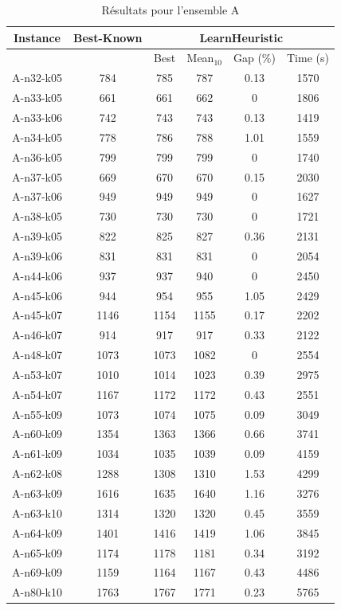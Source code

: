 \documentclass[a4paper,11pt]{article}%
\begin{document}
\begin{table}[h!]
\caption{Résultats pour l'ensemble A}
\label{TA}
\begin{center}
\begin{tabular}{|@{}c@{}|@{}c@{}|@{}c@{}|@{}c@{}|@{}c@{}|@{}c@{}|}

\hline
 Instance & Best-Known & \multicolumn{4}{c|}{LearnHeuristic}  \\
 \hline
 & & Best & Mean$_{10}$ & Gap (\%) & Time (s) \\ 
 \hline
 A-n32-k05 & 784 & 785 & 787 & 0.13 & 1570  \\
 \hline
 A-n33-k05   & 661 & 661 & 662 &0 & 1806   \\
  \hline
   A-n33-k06 & 742 & 743 & 743 &0.13 & 1419  \\
 \hline
   A-n34-k05 & 778 & 786 & 788 &1.01 & 1559  \\
  \hline
   A-n36-k05 & 799 & 799 & 799 & 0 & 1740  \\
 \hline
  A-n37-k05  & 669 & 670 & 670 & 0.15 & 2030  \\
  \hline
  A-n37-k06 & 949 & 949 & 949 & 0 & 1627 \\
 \hline
  A-n38-k05  & 730 & 730 & 730 & 0 & 1721 \\
 \hline
 A-n39-k05 & 822 & 825 & 827 & 0.36 & 2131 \\
 \hline
  A-n39-k06  & 831 & 831 & 831 & 0 & 2054   \\
 \hline
   A-n44-k06 & 937 & 937 & 940 & 0 & 2450   \\
  \hline
   A-n45-k06 & 944 & 954 & 955 & 1.05 & 2429  \\
 \hline 
  A-n45-k07  & 1146 & 1154& 1155 & 0.17 & 2202 \\
  \hline
  A-n46-k07  & 914 & 917& 917&0.33 & 2122  \\
  \hline
  A-n48-k07 & 1073 & 1073 & 1082 &0 & 2554  \\
 \hline
  A-n53-k07  & 1010 & 1014 & 1023 &0.39 & 2975   \\
  \hline
  A-n54-k07  & 1167 & 1172 & 1172 &0.43 & 2551   \\
  \hline
  A-n55-k09 & 1073 & 1074 & 1075 &0.09 & 3049  \\
 \hline 
   A-n60-k09 & 1354 & 1363 & 1366 &0.66 & 3741   \\
  \hline 
  A-n61-k09  & 1034 & 1035 & 1039 &0.09 & 4159  \\
  \hline
    A-n62-k08  & 1288 & 1308 & 1310 &1.53 & 4299   \\
  \hline
    A-n63-k09  & 1616 & 1635 & 1640 &1.16 & 3276   \\
  \hline
    A-n63-k10  & 1314 & 1320 &1320 &0.45 & 3559   \\
  \hline
    A-n64-k09  & 1401 & 1416 & 1419 &1.06 & 3845   \\
  \hline
    A-n65-k09  & 1174 & 1178 & 1181 &0.34 & 3192   \\
  \hline
    A-n69-k09  & 1159 & 1164 & 1167 & 0.43 & 4486   \\
  \hline
    A-n80-k10  & 1763 & 1767 & 1771 & 0.23 & 5765   \\
  \hline
\end{tabular}
\end{center}
\end{table}
\end{document}
